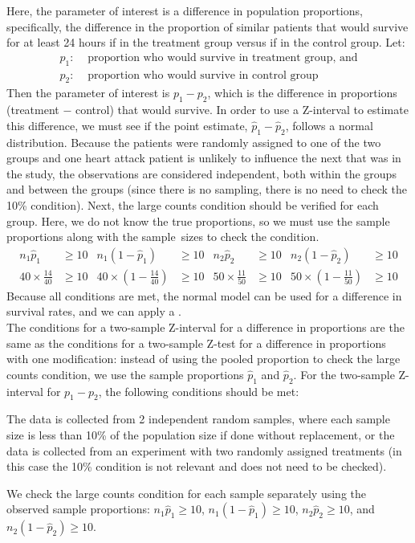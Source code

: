 Here, the parameter of interest is a difference in population proportions, specifically, the difference in the proportion of similar patients that would survive for at least 24 hours if in the treatment group versus if in the control group.  Let:
\begin{align*}
p_1:& \text{ proportion who would survive in treatment group, and} \\
p_2:& \text{ proportion who would survive in control group}
\end{align*}
Then the parameter of interest is $p_1 - p_2$, which is the difference in proportions (treatment $-$ control) that would survive.  In order to use a Z-interval to estimate this difference, we must see if the point estimate, $\hat{p}_{1} - \hat{p}_{2}$, follows a normal distribution.  Because the patients were randomly assigned to one of the two groups and one heart attack patient is unlikely to influence the next that was in the study, the observations are considered independent, both within the groups and between the groups (since there is no sampling, there is no need to check the 10\% condition).  Next, the large counts condition should be verified for each group.  Here, we do not know the true proportions, so we must use the sample proportions along with the sample~sizes to check the condition.
\begin{align*}
n_1\hat{p}_1&\ge 10 & n_1(1-\hat{p}_1)&\ge 10 & n_2\hat{p}_2&\ge 10 & n_2(1-\hat{p}_2)&\ge 10 \\
40 \times \frac{14}{40} &\ge 10
	&40 \times (1-\frac{14}{40}) &\ge 10
	&50 \times \frac{11}{50} &\ge 10
	&50 \times (1-\frac{11}{50}) &\ge 10
\end{align*}
Because all conditions are met, the normal model can be used for a difference in survival rates, and we can apply a .\\

The conditions for a two-sample Z-interval for a difference in proportions are the same as the conditions for a two-sample Z-test for a difference in proportions with one modification: instead of using the pooled proportion to check the large counts condition, we use the sample proportions $\hat{p}_1$ and $\hat{p}_2$.    For the two-sample Z-interval for $p_1-p_2$, the following conditions should be met:
\begin{description}
\setlength{\itemsep}{0mm}
\item[Independence.]
  The data is collected from 2 independent random samples, where each sample size is less than 10\% of the population size if done without replacement, or the data is collected from an experiment with two randomly assigned treatments (in this case the 10\% condition is not relevant and does not need to be checked).
\item[Large counts.]
 We check the large counts condition for each sample separately using the observed sample proportions:  $n_1\hat{p}_1 \ge 10$, $n_1(1-\hat{p}_1) \ge 10$, $n_2\hat{p}_2 \ge 10$, and $n_2(1 -\hat{p}_2) \ge 10$.
\end{description}


